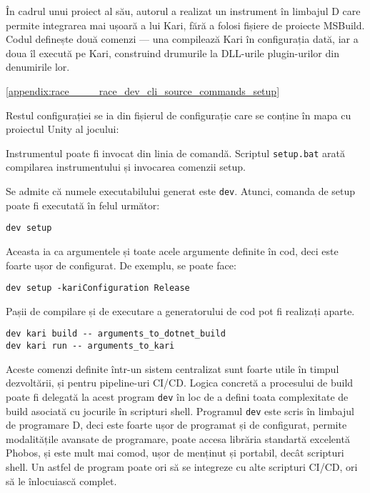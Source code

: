 \documentclass[a4paper,12pt]{report}
\begin{document}
În cadrul unui proiect al său, autorul a realizat un instrument în limbajul D care permite integrarea mai ușoară a lui Kari, fără a folosi fișiere de proiecte MSBuild.
Codul definește două comenzi — una compilează Kari în configurația dată, iar a doua îl execută pe Kari, construind drumurile la DLL-urile plugin-urilor din denumirile lor.

\ref{appendix:race____race_dev_cli_source_commands_setup}

Restul configurației se ia din fișierul de configurație care se conține în mapa cu proiectul Unity al jocului:



Instrumentul poate fi invocat din linia de comandă.
Scriptul \texttt{setup.bat} arată compilarea instrumentului și invocarea comenzii setup.



Se admite că numele executabilului generat este \texttt{dev}.
Atunci, comanda de setup poate fi executată în felul următor:

\begin{verbatim}
dev setup
\end{verbatim}

Aceasta ia ca argumentele și toate acele argumente definite în cod, deci este foarte ușor de configurat.
De exemplu, se poate face:

\begin{verbatim}
dev setup -kariConfiguration Release
\end{verbatim}

Pașii de compilare și de executare a generatorului de cod pot fi realizați aparte.

\begin{verbatim}
dev kari build -- arguments_to_dotnet_build
dev kari run -- arguments_to_kari
\end{verbatim}

Aceste comenzi definite într-un sistem centralizat sunt foarte utile în timpul dezvoltării, și pentru pipeline-uri CI/CD.
Logica concretă a procesului de build poate fi delegată la acest program \texttt{dev} în loc de a defini toata complexitate de build asociată cu jocurile în scripturi shell.
Programul \texttt{dev} este scris în limbajul de programare D, deci este foarte ușor de programat și de configurat, permite modalitățile avansate de programare, poate accesa librăria standartă excelentă Phobos, și este mult mai comod, ușor de menținut și portabil, decât scripturi shell.
Un astfel de program poate ori să se integreze cu alte scripturi CI/CD, ori să le înlocuiască complet.
\end{document}
